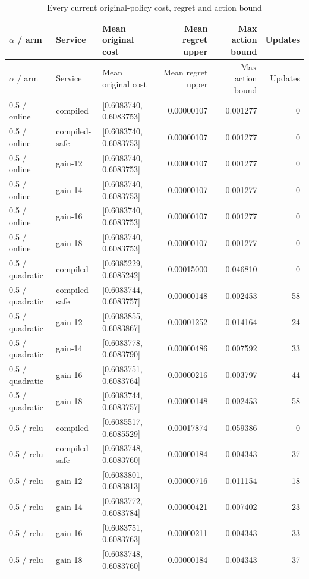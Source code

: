 \begin{longtable}{@{}lllrrr@{}}\caption{Every current original-policy cost, regret and action bound}\\
\toprule $\alpha$ / arm & Service & Mean original cost & Mean regret upper & Max action bound & Updates\\\midrule\endfirsthead
\toprule $\alpha$ / arm & Service & Mean original cost & Mean regret upper & Max action bound & Updates\\\midrule\endhead
0.5 / online & compiled & [0.6083740, 0.6083753] & 0.00000107 & 0.001277 & 0\\
0.5 / online & compiled-safe & [0.6083740, 0.6083753] & 0.00000107 & 0.001277 & 0\\
0.5 / online & gain-12 & [0.6083740, 0.6083753] & 0.00000107 & 0.001277 & 0\\
0.5 / online & gain-14 & [0.6083740, 0.6083753] & 0.00000107 & 0.001277 & 0\\
0.5 / online & gain-16 & [0.6083740, 0.6083753] & 0.00000107 & 0.001277 & 0\\
0.5 / online & gain-18 & [0.6083740, 0.6083753] & 0.00000107 & 0.001277 & 0\\
0.5 / quadratic & compiled & [0.6085229, 0.6085242] & 0.00015000 & 0.046810 & 0\\
0.5 / quadratic & compiled-safe & [0.6083744, 0.6083757] & 0.00000148 & 0.002453 & 58\\
0.5 / quadratic & gain-12 & [0.6083855, 0.6083867] & 0.00001252 & 0.014164 & 24\\
0.5 / quadratic & gain-14 & [0.6083778, 0.6083790] & 0.00000486 & 0.007592 & 33\\
0.5 / quadratic & gain-16 & [0.6083751, 0.6083764] & 0.00000216 & 0.003797 & 44\\
0.5 / quadratic & gain-18 & [0.6083744, 0.6083757] & 0.00000148 & 0.002453 & 58\\
0.5 / relu & compiled & [0.6085517, 0.6085529] & 0.00017874 & 0.059386 & 0\\
0.5 / relu & compiled-safe & [0.6083748, 0.6083760] & 0.00000184 & 0.004343 & 37\\
0.5 / relu & gain-12 & [0.6083801, 0.6083813] & 0.00000716 & 0.011154 & 18\\
0.5 / relu & gain-14 & [0.6083772, 0.6083784] & 0.00000421 & 0.007402 & 23\\
0.5 / relu & gain-16 & [0.6083751, 0.6083763] & 0.00000211 & 0.004343 & 33\\
0.5 / relu & gain-18 & [0.6083748, 0.6083760] & 0.00000184 & 0.004343 & 37\\

\end{longtable}
